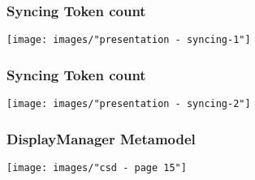 \begin{frame}
  \frametitle{Syncing Token count}
  \hspace{-1cm}
  \texttt{[image: images/"presentation - syncing-1"]}
\end{frame}

\begin{frame}
  \frametitle{Syncing Token count}
  \hspace{-1cm}
  \texttt{[image: images/"presentation - syncing-2"]}
\end{frame}










\begin{frame}
  \frametitle{DisplayManager Metamodel}
  \centering
  \hspace{-1cm}
  \texttt{[image: images/"csd - page 15"]}

\end{frame}

